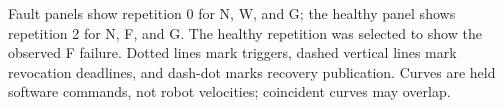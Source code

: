 \caption{Fault panels show repetition 0 for N, W, and G; the healthy panel shows repetition 2 for N, F, and G. The healthy repetition was selected to show the observed F failure. Dotted lines mark triggers, dashed vertical lines mark revocation deadlines, and dash-dot marks recovery publication. Curves are held software commands, not robot velocities; coincident curves may overlap.}
